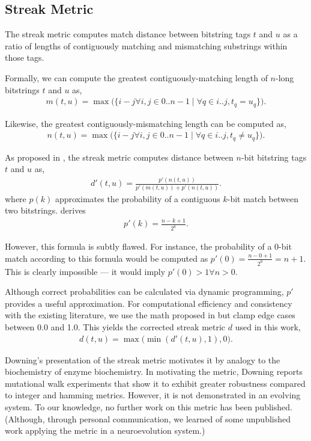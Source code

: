 \subsection{Streak Metric} \label{sec:streak}

The streak metric computes match distance between bitstring tags $t$ and $u$ as a ratio of lengths of contiguously matching and mismatching substrings within those tags.

Formally, we can compute the greatest contiguously-matching length of $n$-long bitstrings $t$ and $u$ as,
\begin{align*}
m(t, u) = \max\Big(\{i - j \forall i, j \in 0..n-1 \mid \forall q \in i..j, t_q = u_q \}\Big).
\end{align*}

Likewise, the greatest contiguously-mismatching length can be computed as,
\begin{align*}
n(t, u) = \max\Big(\{i - j \forall i, j \in 0..n-1 \mid \forall q \in i..j, t_q \neq u_q \}\Big).
\end{align*}

As proposed in \cite{downing2015intelligence}, the streak metric computes distance between $n$-bit bitstring tags $t$ and $u$ as,
\begin{align*}
d'(t, u)
= \frac{p'(n(t,u))}{p'(m(t,u)) + p'(n(t,u))}.
\end{align*}
where $p(k)$ approximates the probability of a contiguous $k$-bit match between two bitstrings.
\cite{downing2015intelligence} derives
\begin{align*}
p'(k)
= \frac{n - k + 1}{2^k}.
\end{align*}

However, this formula is subtly flawed.
For instance, the probability of a $0$-bit match according to this formula would be computed as $p'(0) = \frac{n - 0 + 1}{2^0} = n + 1$.
This is clearly impossible --- it would imply $p'(0) > 1 \forall n > 0$.

Although correct probabilities can be calculated via dynamic programming, $p'$ provides a useful approximation.
For computational efficiency and consistency with the existing literature, we use the math proposed in \citep{downing2015intelligence} but clamp edge cases between 0.0 and 1.0.
This yields the corrected streak metric $d$ used in this work,
\begin{align*}
d(t, u) = \max\Big( \min( d'(t, u), 1), 0 \Big).
\end{align*}

Downing's presentation of the streak metric motivates it by analogy to the biochemistry of enzyme biochemistry.
In motivating the metric, Downing reports mutational walk experiments that show it to exhibit greater robustness compared to integer and hamming metrics.
However, it is not demonstrated in an evolving system.
To our knowledge, no further work on this metric has been published.
(Although, through personal communication, we learned of some unpublished work applying the metric in a neuroevolution system.)
